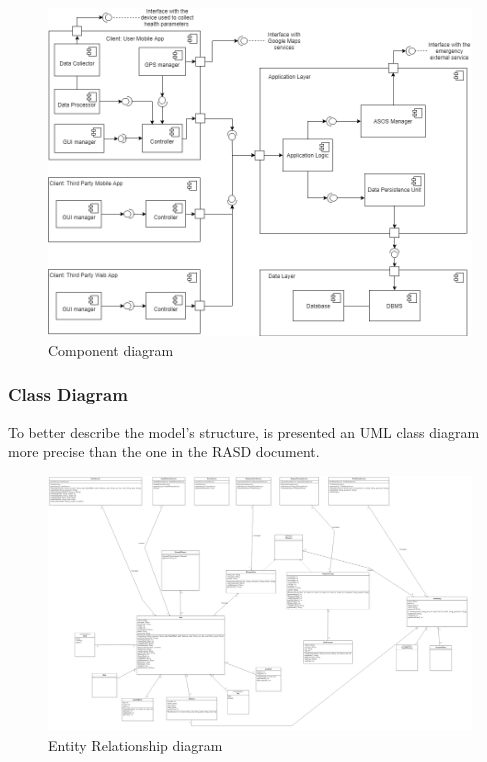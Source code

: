 \begin{figure}[h!]
	\includegraphics[width=1.0\textwidth]{./pictures/component_diagram.png}\par
	\caption{Component diagram}
\end{figure}
\FloatBarrier

\subsubsection{Class Diagram}
To better describe the model's structure, is presented an UML class diagram more precise than the one in the RASD document. \\

\begin{figure}[h!]
	\includegraphics[width=1.0\textwidth]{./pictures/class_diagram.png}\par
	\caption{Entity Relationship diagram}
\end{figure}

